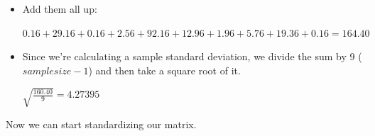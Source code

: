 \documentclass[12pt]{article}
\begin{document}
\begin{itemize}
\begin{itemize}
        \item
        Add them all up:\\
        \begin{center}
            $0.16+29.16+0.16+2.56+92.16+12.96+1.96+5.76+19.36+0.16 = 164.40$
        \end{center}
        
        \item
        Since we're calculating a sample standard deviation, we divide the sum by 9 ($sample size - 1$) and then take a square root of it.\\
        \begin{center}
            $\sqrt{\frac{160.40}{9}} = 4.27395$
        \end{center}
        
    \end{itemize}
\end{itemize}
\noindent
Now we can start standardizing our matrix.
\end{document}

